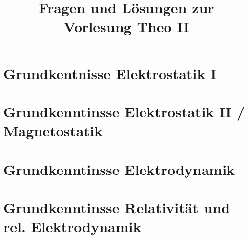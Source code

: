 
\newcommand{\subdir}{subtex}
\title{Fragen und Lösungen zur Vorlesung Theo II}


\newpage
\setcounter{page}{1}
\tableofcontents
\newpage
\section{Grundkentnisse Elektrostatik I}

\newpage
\section{Grundkenntinsse Elektrostatik II / Magnetostatik}

\newpage
\section{Grundkenntinsse Elektrodynamik}

\newpage
\section{Grundkenntinsse Relativität und rel. Elektrodynamik}


